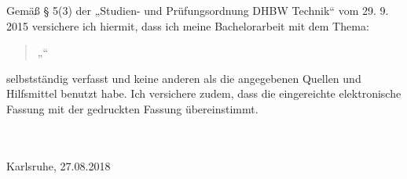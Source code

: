 Gemäß § 5(3) der „Studien- und Prüfungsordnung DHBW Technik“ vom 29. 9. 2015 versichere ich hiermit, dass ich meine Bachelorarbeit mit dem Thema:
   \begin{quote}
     „\textit{\Titel}“
    \end{quote}
selbstständig verfasst und keine anderen als die angegebenen Quellen und Hilfsmittel benutzt habe. Ich versichere zudem, dass die eingereichte elektronische Fassung mit der gedruckten Fassung übereinstimmt.


\vspace{3cm}
\noindent
\underline{\hspace{10cm}}\\\\
Karlsruhe, 27.08.2018\hspace{4cm}\\\\\\
